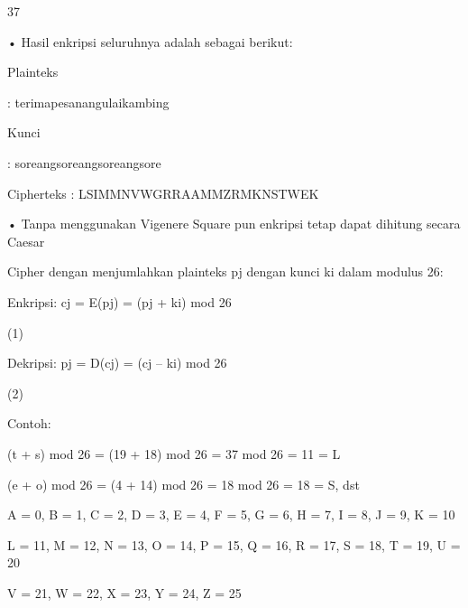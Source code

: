 \documentclass{article}
\begin{document}

37

• Hasil enkripsi seluruhnya adalah sebagai berikut:

 Plainteks 

: terimapesanangulaikambing

 Kunci 

: soreangsoreangsoreangsore

 Cipherteks : LSIMMNVWGRRAAMMZRMKNSTWEK

• Tanpa menggunakan Vigenere Square pun enkripsi tetap dapat dihitung secara Caesar 

Cipher dengan menjumlahkan  plainteks pj  dengan kunci ki dalam modulus 26:

              Enkripsi:  cj = E(pj) = (pj + ki) mod 26   

(1)


Dekripsi:  pj = D(cj) = (cj – ki) mod 26   

(2)

    Contoh:


(t + s)  mod 26 = (19 + 18) mod 26 = 37 mod 26 = 11 =  L


(e + o) mod 26 = (4 + 14) mod 26 = 18 mod 26 = 18 = S, dst

A = 0,  B = 1, C = 2,  D = 3,  E = 4,  F = 5,  G = 6,  H = 7,  I = 8,  J = 9,  K = 10

L = 11, M = 12, N = 13, O = 14, P = 15, Q = 16, R = 17, S = 18, T = 19, U = 20

V = 21, W = 22, X = 23, Y = 24, Z = 25
\end{document}
